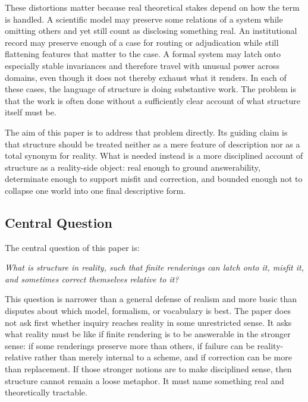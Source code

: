 \documentclass[11pt]{article}
\renewenvironment{quote}
  {\list{}{\leftmargin=1.4em \rightmargin=1.0em}%
   \item\relax\color{softink}\itshape}
  {\endlist}
\begin{document}
These distortions matter because real theoretical stakes depend on how the term is handled. A scientific model may preserve some relations of a system while omitting others and yet still count as disclosing something real. An institutional record may preserve enough of a case for routing or adjudication while still flattening features that matter to the case. A formal system may latch onto especially stable invariances and therefore travel with unusual power across domains, even though it does not thereby exhaust what it renders. In each of these cases, the language of structure is doing substantive work. The problem is that the work is often done without a sufficiently clear account of what structure itself must be. \cite{FriggHartmann2025ModelsScienceSEP,FriggNguyen2021ScientificRepresentationSEP,BowkerStar1999SortingThingsOut}

The aim of this paper is to address that problem directly. Its guiding claim is that structure should be treated neither as a mere feature of description nor as a total synonym for reality. What is needed instead is a more disciplined account of structure as a reality-side object: real enough to ground answerability, determinate enough to support misfit and correction, and bounded enough not to collapse one world into one final descriptive form.

\subsection{Central Question}

The central question of this paper is:

\begin{quote}
What is structure in reality, such that finite renderings can latch onto it, misfit it, and sometimes correct themselves relative to it?
\end{quote}

This question is narrower than a general defense of realism and more basic than disputes about which model, formalism, or vocabulary is best. The paper does not ask first whether inquiry reaches reality in some unrestricted sense. It asks what reality must be like if finite rendering is to be answerable in the stronger sense: if some renderings preserve more than others, if failure can be reality-relative rather than merely internal to a scheme, and if correction can be more than replacement. If those stronger notions are to make disciplined sense, then structure cannot remain a loose metaphor. It must name something real and theoretically tractable. \cite{Chakravartty2011ScientificRealismSEP,FriggNguyen2021ScientificRepresentationSEP}
\end{document}

